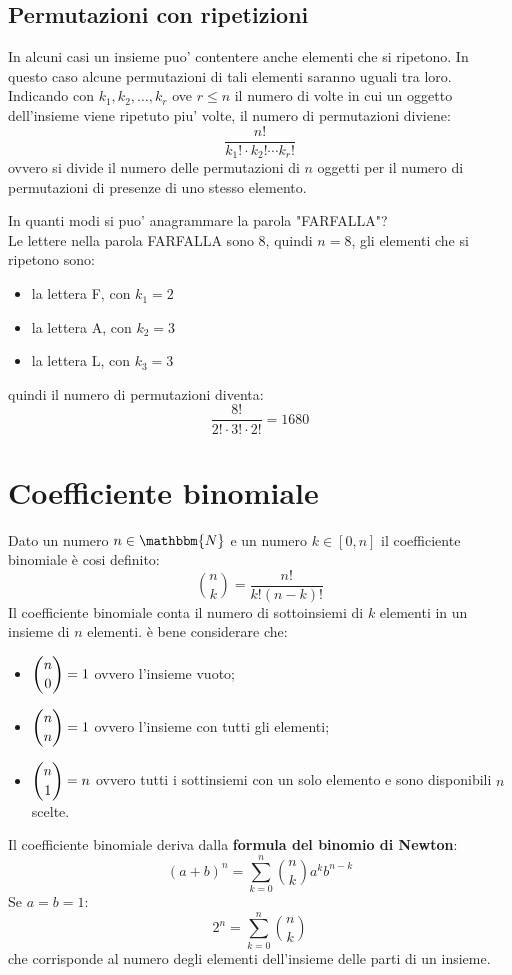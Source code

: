 \documentclass[12pt]{report}
\begin{document}
	\subsection{Permutazioni con ripetizioni}
	In alcuni casi un insieme puo' contentere anche elementi che si ripetono. In questo caso alcune permutazioni di tali elementi saranno uguali tra loro. Indicando con $k_1, k_2, \dots, k_r$ ove $r \leq n$ il numero di volte in cui un oggetto dell'insieme viene ripetuto piu' volte, il numero di permutazioni diviene:
	\[
	\dfrac{n!}{k_1!\cdot k_2! \cdots k_r!}
	\]
	ovvero si divide il numero delle permutazioni di $n$ oggetti per il numero di permutazioni di presenze di uno stesso elemento.
	\begin{example}{}{}
		In quanti modi si puo' anagrammare la parola "FARFALLA"? \\
		Le lettere nella parola FARFALLA sono 8, quindi $n=8$, gli elementi che si ripetono sono:
		\begin{itemize}
			\item la lettera F, con $k_1 = 2$
			\item la lettera A, con $k_2 = 3$
			\item la lettera L, con $k_3 = 3$
		\end{itemize}
		quindi il numero di permutazioni diventa:
		\[
		\dfrac{8!}{2! \cdot 3! \cdot 2!} = 1680
		\]
	\end{example}
	\section{Coefficiente binomiale}
	Dato un numero $n \in \mathbbm{N}$ e un numero $k \in [0, n]$ il coefficiente binomiale è cosi definito:
	\[
	\binom{n}{k} = \frac{n!}{k!(n - k)!}
	\]
	Il coefficiente binomiale conta il numero di sottoinsiemi di $k$ elementi in un insieme di $n$ elementi.
	è bene considerare che:
	\begin{itemize}
		\item $\mathlarger{\binom{n}{0}} = 1$ ovvero l'insieme vuoto;
		\item $\mathlarger{\binom{n}{n}} = 1$ ovvero l'insieme con tutti gli elementi;
		\item $\mathlarger{\binom{n}{1}} = n$ ovvero tutti i sottinsiemi con un solo elemento e sono disponibili $n$ scelte.
	\end{itemize}
	Il coefficiente binomiale deriva dalla \textbf{formula del binomio di Newton}:
	\[
	(a + b)^n = \sum_{k=0}^{n}\binom{n}{k}a^kb^{n-k}
	\]
	Se $a=b=1$:
	\[
	2^n = \sum_{k=0}^{n}\binom{n}{k}
	\]
	che corrisponde al numero degli elementi dell'insieme delle parti di un insieme.
\end{document}
